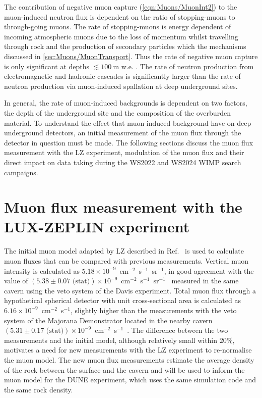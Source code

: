 The contribution of negative muon capture (\autoref{eqn:Muons/MuonInt2}) to the muon-induced neutron flux is dependent on the ratio of stopping-muons to through-going muons. The rate of stopping-muons is energy dependent of incoming atmospheric muons due to the loss of momentum whilst travelling through rock and the production of secondary particles which the mechanisms discussed in \autoref{sec:Muons/MuonTransport}. Thus the rate of negative muon capture is only significant at depths $\lesssim100~\text{m w.e.}$ \cite{Gaisser_Engel_Resconi_2016}. The rate of neutron production from electromagnetic and hadronic cascades is significantly larger than the rate of neutron production via muon-induced spallation at deep underground sites.

In general, the rate of muon-induced backgrounds is dependent on two factors, the depth of the underground site and the composition of the overburden material. To understand the effect that muon-induced background have on deep underground detectors, an initial measurement of the muon flux through the detector in question must be made. The following sections discuss the muon flux measurement with the LZ experiment, modulation of the muon flux and their direct impact on data taking during the WS2022 and WS2024 WIMP search campaigns.  

\section{Muon flux measurement with the LUX-ZEPLIN experiment}\label{sec:Muons/MuonFluxMeasurementWithLZ}
The initial muon model adapted by LZ described in Ref.~\cite{LZ_SIMS} is used to calculate muon fluxes that can be compared with previous measurements. Vertical muon intensity is calculated as $5.18\times10^{-9}$~cm$^{-2}$~s$^{-1}$~sr$^{-1}$, in good agreement with the value of $(5.38\pm0.07\text{ (stat)})\times10^{-9}$~cm$^{-2}$~s$^{-1}$~sr$^{-1}$~\cite{Cherry} measured in the same cavern using the veto system of the Davis experiment. Total muon flux through a hypothetical spherical detector with unit cross-sectional area is calculated as $6.16\times10^{-9}$~cm$^{-2}$~s$^{-1}$, slightly higher than the measurements with the veto system of the Majorana Demonstrator located in the nearby cavern $(5.31\pm0.17 \text{ (stat)})\times10^{-9}$~cm$^{-2}$~s$^{-1}$~\cite{majorana}.
The difference between the two measurements and the initial model, although relatively small within $20\%$, motivates a need for new measurements with the LZ experiment to re-normalise the muon model. The new muon flux measurements estimate the average density of the rock between the surface and the cavern and will be used to inform the muon model for the DUNE experiment\cite{DUNE}, which uses the same simulation code and the same rock density.

